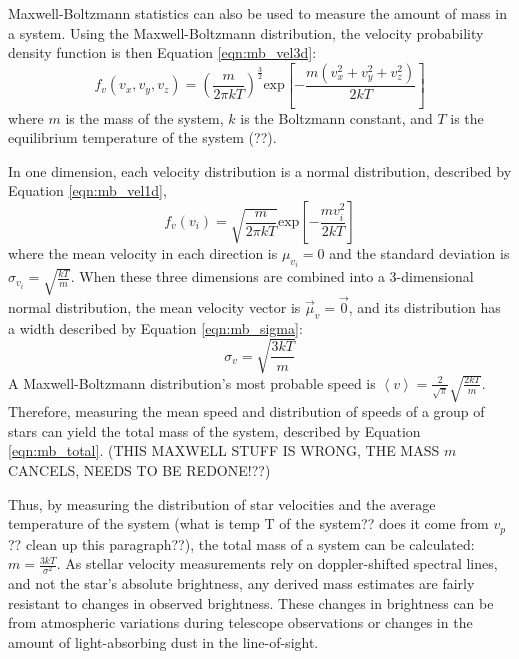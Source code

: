     Maxwell-Boltzmann statistics can also be used to measure the amount of mass in a system.
    Using the Maxwell-Boltzmann distribution, the velocity probability density function is then Equation \ref{eqn:mb_vel3d}:
    \begin{equation}\label{eqn:mb_vel3d}
      f_v(v_x,v_y,v_z)= \left ( \frac{m}{2\pi k T} \right ) ^ { \frac{3}{2} } \text{exp} \left [ - \frac{m \left ( v_x^2 + v_y^2 + v_z^2 \right )}{2 k T} \right ]
    \end{equation}
    where $m$ is the mass of the system, $k$ is the Boltzmann constant, and $T$ is the equilibrium temperature of the system {\color{red}(??)}.
    
    In one dimension, each velocity distribution is a normal distribution, described by Equation \ref{eqn:mb_vel1d},
    \begin{equation}\label{eqn:mb_vel1d}
      f_v(v_i) = \sqrt{ \frac{m}{2\pi k T} } \text{exp} \left [ - \frac{m v_i^2}{2kT} \right ]
    \end{equation}
    where the mean velocity in each direction is $\mu_{v_i} = 0$ and the standard deviation is $\sigma_{v_i} = \sqrt{\frac{kT}{m}}$.
    When these three dimensions are combined into a 3-dimensional normal distribution, the mean velocity vector is $\vec{\mu}_v = \vec{0}$, and its distribution has a width described by Equation \ref{eqn:mb_sigma}:
    \begin{equation}\label{eqn:mb_sigma}
      \sigma_v = \sqrt{\frac{3kT}{m}}
    \end{equation}
    A Maxwell-Boltzmann distribution's most probable speed is $\left \langle v \right \rangle = \frac{2}{\sqrt{\pi}} \sqrt{\frac{2kT}{m}}$.
    Therefore, measuring the mean speed and distribution of speeds of a group of stars can yield the total mass of the system, described by Equation \ref{eqn:mb_total}.
    {\color{red}(THIS MAXWELL STUFF IS WRONG, THE MASS $m$ CANCELS, NEEDS TO BE REDONE!??)}
    
    Thus, by measuring the distribution of star velocities and the average temperature of the system {\color{red}(what is temp T of the system??  does it come from $v_p$??  clean up this paragraph??)}, the total mass of a system can be calculated: $m = \frac{3kT}{\sigma^2}$.
    As stellar velocity measurements rely on doppler-shifted spectral lines, and not the star's absolute brightness, any derived mass estimates are fairly resistant to changes in observed brightness.
    These changes in brightness can be from atmospheric variations during telescope observations or changes in the amount of light-absorbing dust in the line-of-sight.


